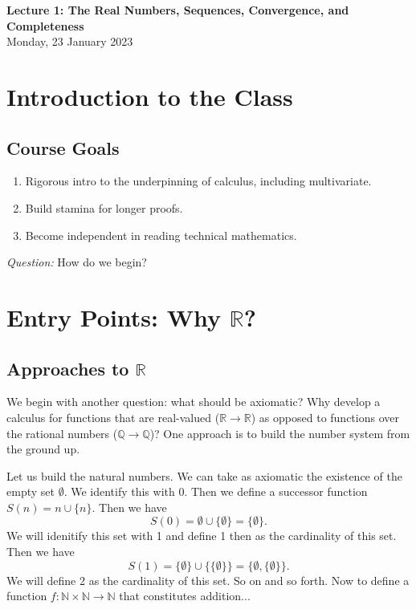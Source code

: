 \documentclass[11pt]{article}
\theoremstyle{definition}
\newcommand{\R}{\mathbb{R}}                      %
\begin{document}
\thispagestyle{empty}

\begin{center}
{\LARGE \bf Lecture 1: The Real Numbers, Sequences, Convergence, and Completeness}\\
{\large Monday, 23 January 2023}\\

\end{center}
\section{Introduction to the Class}
\subsection{Course Goals}
\begin{enumerate}
    \item Rigorous intro to the underpinning of calculus, including multivariate.
    \item Build stamina for longer proofs.
    \item Become independent in reading technical mathematics.
\end{enumerate}
\textit{Question:} How do we begin?

\section{Entry Points: Why $\R$?}
\subsection{Approaches to $\R$}
We begin with another question: what should be axiomatic?  Why develop a calculus for functions that are real-valued ($\R\to\R$) as opposed to functions over the rational numbers ($\mathbb{Q}\to\mathbb{Q}$)? One approach is to build the number system from the ground up.

\ex Let us build the natural numbers. We can take as axiomatic the existence of the empty set $\emptyset$. We identify this with 0. Then we define a successor function $S(n)=n\cup \{n\}$. Then we have
$$
S(0)=\emptyset \cup \{\emptyset\} = \{\emptyset\}.
$$
We will idenitify this set with 1 and define 1 then as the cardinality of this set. Then we have
$$
S(1)=\{\emptyset\}\cup \{\{\emptyset\}\} =\{\emptyset,\{\emptyset\}\}.
$$
We will define 2 as the cardinality of this set. So on and so forth. Now to define a function $f:\mathbb{N}\times\mathbb{N}\to \mathbb{N}$ that constitutes addition...
\end{document}
